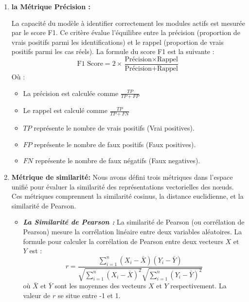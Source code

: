 \begin{enumerate}

    \item \textbf{la Métrique Précision :}
    
        La capacité du modèle à identifier correctement les modules actifs est mesurée par le score F1. Ce critère évalue l'équilibre entre la précision (proportion de vrais positifs parmi les identifications) et le rappel (proportion de vrais positifs parmi les cas réels). La formule du score F1 est la suivante :
            \begin{equation}
            \text{F1 Score} = 2 \times \frac{\text{Précision} \times \text{Rappel}}{\text{Précision} + \text{Rappel}}
            \end{equation}
            Où :
            \begin{itemize}
                \item La précision est calculée comme \(\frac{TP}{TP + FP}\)
                 \item  Le rappel est calculé comme \(\frac{TP}{TP + FN}\)
                 \item \(TP\) représente le nombre de vrais positifs (Vrai positives).
                 \item  \(FP\) représente le nombre de faux positifs (Faux positives).
                 \item \(FN\) représente le nombre de faux négatifs (Faux negatives).
            \end{itemize}
            
    \item \textbf{Métrique de similarité:} 
        Nous avons défini trois métriques dans l'espace unifié pour évaluer la similarité des représentations vectorielles des nœuds. Ces métriques comprennent la similarité cosinus, la distance euclidienne, et la similarité de Pearson. 
        \begin{itemize}
           \item \textbf{\textit{La Similarité de Pearson :}}
                La similarité de Pearson (ou corrélation de Pearson) mesure la corrélation linéaire entre deux variables aléatoires. La formule pour calculer la corrélation de Pearson entre deux vecteurs \(X\) et \(Y\) est :
                \begin{equation}
                     r = \frac{\sum_{i=1}^{n} (X_i - \bar{X})(Y_i - \bar{Y})}{\sqrt{\sum_{i=1}^{n} (X_i - \bar{X})^2} \sqrt{\sum_{i=1}^{n} (Y_i - \bar{Y})^2}}
                \end{equation}
                où \(\bar{X}\) et \(\bar{Y}\) sont les moyennes des vecteurs \(X\) et \(Y\) respectivement. La valeur de \(r\) se situe entre -1 et 1.
                

\end{itemize}
\end{enumerate}
